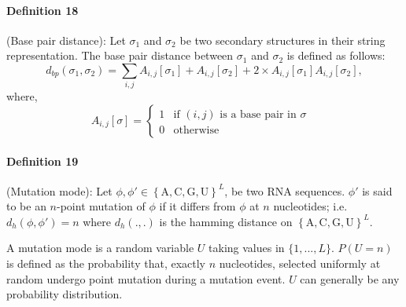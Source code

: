 \paragraph{\textbf{Definition 18}} (Base pair distance):  Let $\sigma_1$ and $\sigma_2$ be two secondary structures in their string representation.  The base pair distance between $\sigma_1$ and $\sigma_2$ is defined as follows: 
\begin{equation}
	d_{bp}(\sigma_1, \sigma_2 )= \sum_{i,j} A_{i,j}[\sigma_1] + A_{i,j}[\sigma_2] + 2\times A_{i,j}[\sigma_1] A_{i,j}[\sigma_2],
\end{equation}
where, 
$$
A_{i,j}[\sigma] =
\begin{cases}
1 & \text{if $(i,j)$ is a base pair in $\sigma$ } \\
0 & \text{otherwise}
\end{cases}
$$





\paragraph{\textbf{Definition 19}} (Mutation mode): 
Let $\phi, \phi' \in \left\{ \text{A}, \text{C}, \text{G}, \text{U} \right\}^L$, be  two RNA sequences. $\phi'$ is said to be an $n$-point mutation of $\phi$ if it differs from $\phi$ at $n$ nucleotides; i.e. $d_h(\phi, \phi')=n$ where $d_h(.,.)$ is the hamming distance on $\left\{ \text{A}, \text{C}, \text{G}, \text{U} \right\}^L$. 

A mutation mode is a random variable $U$ taking values in $\{1,...,L\}$. $P(U=n)$ is defined as the probability that, exactly $n$ nucleotides, selected uniformly at random undergo point mutation during a mutation event. $U$ can generally be any probability distribution.

